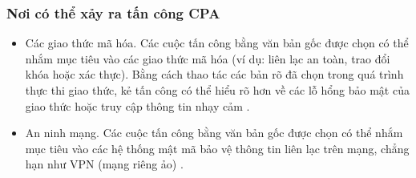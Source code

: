 \subsubsection{Nơi có thể xảy ra tấn công CPA}
\begin{itemize}
    \item Các giao thức mã hóa. Các cuộc tấn công bằng văn bản gốc được chọn có thể nhắm mục tiêu vào các giao thức mã hóa (ví dụ: liên lạc an toàn, trao đổi khóa hoặc xác thực). Bằng cách thao tác các bản rõ đã chọn trong quá trình thực thi giao thức, kẻ tấn công có thể hiểu rõ hơn về các lỗ hổng bảo mật của giao thức hoặc truy cập thông tin nhạy cảm \cite{nordvpn-2024}.
    \item An ninh mạng. Các cuộc tấn công bằng văn bản gốc được chọn có thể nhắm mục tiêu vào các hệ thống mật mã bảo vệ thông tin liên lạc trên mạng, chẳng hạn như VPN (mạng riêng ảo) \cite{nordvpn-2024}.
\end{itemize}
